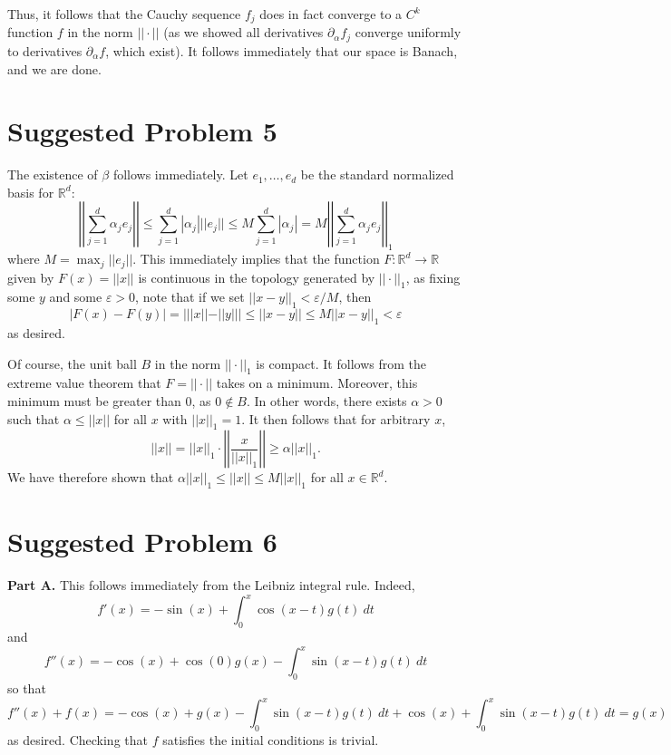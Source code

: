 \documentclass[aps,pra,showpacs,notitlepage,onecolumn,superscriptaddress,nofootinbib]{revtex4-1}
\theoremstyle{definition}
\begin{document}
Thus, it follows that the Cauchy sequence $f_j$ does in fact converge to a $C^k$ function $f$ in the norm $||\cdot||$ (as we showed all derivatives $\partial_{\alpha} f_j$ converge uniformly to derivatives $\partial_{\alpha} f$,
which exist). It follows immediately that our space is Banach, and we are done.

\section{Suggested Problem 5}

\noindent The existence of $\beta$ follows immediately. Let $e_1, \dots, e_d$ be the standard normalized basis for $\mathbb{R}^d$:
\begin{equation}
  \left|\left| \sum_{j = 1}^{d} \alpha_j e_j \right|\right| \leq \sum_{j = 1}^{d} |\alpha_j| ||e_j|| \leq M \sum_{j = 1}^{d} |\alpha_j| = M  \left|\left| \sum_{j = 1}^{d} \alpha_j e_j \right|\right|_1
\end{equation}
where $M = \max_j ||e_j||$. This immediately implies that the function $F : \mathbb{R}^d \rightarrow \mathbb{R}$ given by $F(x) = ||x||$ is continuous in the topology generated by $||\cdot||_1$, as fixing some $y$ and some $\varepsilon > 0$,
note that if we set $||x - y||_1 < \varepsilon/M$, then
\begin{equation}
  | F(x) - F(y) | = | ||x|| - ||y|| | \leq ||x - y|| \leq M ||x - y||_1 < \varepsilon
\end{equation}
as desired.

Of course, the unit ball $B$ in the norm $||\cdot||_1$ is compact. It follows from the extreme value theorem that $F = ||\cdot||$ takes on a minimum. Moreover, this minimum must be greater than $0$,
as $0 \notin B$. In other words, there exists $\alpha > 0$ such that $\alpha \leq ||x||$ for all $x$ with $||x||_1 = 1$. It then follows that for arbitrary $x$,
\begin{equation}
  ||x|| = ||x||_1 \cdot \left|\left| \frac{x}{||x||_1} \right|\right| \geq \alpha ||x||_1.
\end{equation}
We have therefore shown that $\alpha ||x||_1 \leq ||x|| \leq M ||x||_1$ for all $x \in \mathbb{R}^d$.

\section{Suggested Problem 6}

\noindent \textbf{Part A.} This follows immediately from the Leibniz integral rule. Indeed,
\begin{equation}
  f'(x) = -\sin(x) + \int_{0}^{x} \cos(x - t) g(t) \ dt
\end{equation}
and
\begin{equation}
  f''(x) = -\cos(x) + \cos(0) g(x) - \int_{0}^{x} \sin(x - t) g(t) \ dt
\end{equation}
so that
\begin{equation}
  f''(x) + f(x) = -\cos(x) + g(x) - \int_{0}^{x} \sin(x - t) g(t) \ dt + \cos(x) + \int_{0}^{x} \sin(x - t) g(t) \ dt = g(x)
\end{equation}
as desired. Checking that $f$ satisfies the initial conditions is trivial.
\newline
\end{document}
